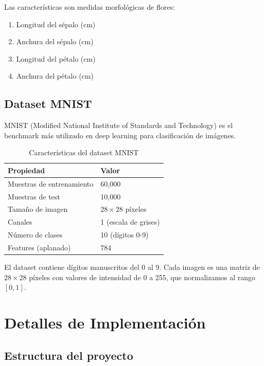 \documentclass[a4paper,11pt]{article}
\begin{document}
Las características son medidas morfológicas de flores:
\begin{enumerate}
    \item Longitud del sépalo (cm)
    \item Anchura del sépalo (cm)
    \item Longitud del pétalo (cm)
    \item Anchura del pétalo (cm)
\end{enumerate}

\subsection{Dataset MNIST}

MNIST (Modified National Institute of Standards and Technology) es el benchmark más utilizado en deep learning para clasificación de imágenes.

\begin{table}[H]
\centering
\caption{Características del dataset MNIST}
\begin{tabular}{ll}
\toprule
Propiedad & Valor \\
\midrule
Muestras de entrenamiento & 60,000 \\
Muestras de test & 10,000 \\
Tamaño de imagen & $28 \times 28$ píxeles \\
Canales & 1 (escala de grises) \\
Número de clases & 10 (dígitos 0-9) \\
Features (aplanado) & 784 \\
\bottomrule
\end{tabular}
\label{tab:mnist_props}
\end{table}

El dataset contiene dígitos manuscritos del 0 al 9. Cada imagen es una matriz de $28 \times 28$ píxeles con valores de intensidad de 0 a 255, que normalizamos al rango $[0, 1]$.

\newpage
\section{Detalles de Implementación}

\subsection{Estructura del proyecto}
\end{document}
